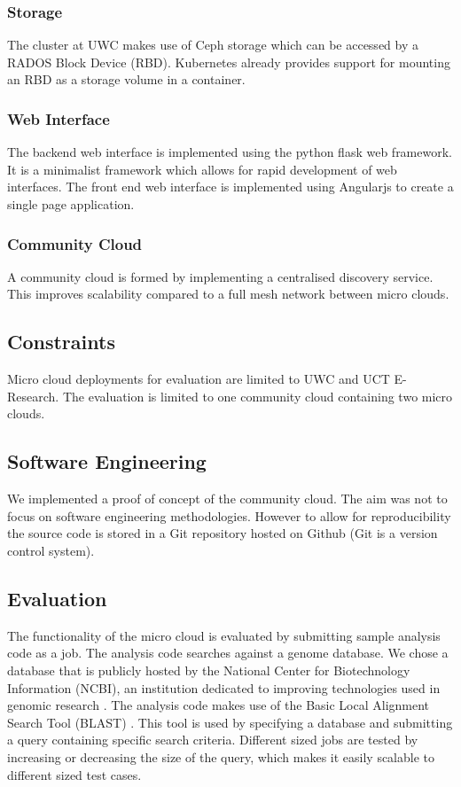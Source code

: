 \documentclass{sig-alternate-05-2015}
\begin{document}
\subsubsection{Storage}
The cluster at UWC makes use of Ceph storage which can be accessed by a RADOS Block Device (RBD). Kubernetes already provides support for mounting an RBD as a storage volume in a container.

\subsubsection{Web Interface}
The backend web interface is implemented using the python flask web framework. It is a minimalist framework which allows for rapid development of web interfaces. 
The front end web interface is implemented using Angularjs to create a single page application. 

\subsubsection{Community Cloud}
A community cloud is formed by implementing a centralised discovery service. This improves scalability compared to a full mesh network between micro clouds.


\subsection{Constraints}
Micro cloud deployments for evaluation are limited to UWC and UCT E-Research. The evaluation is limited to one community cloud containing two micro clouds.

\subsection{Software Engineering}

We implemented a proof of concept of the community cloud. The aim was not to focus on software engineering methodologies. However to allow for reproducibility the source code is stored in a Git repository hosted on Github (Git is a version control system). 




\subsection{Evaluation}
The functionality of the micro cloud is evaluated by submitting sample analysis code as a job. The analysis code searches against a genome database. We chose a database that is publicly hosted by the National Center for Biotechnology Information (NCBI), an institution dedicated to improving technologies used in genomic research \cite{pruitt2005ncbi}. The analysis code makes use of the Basic Local Alignment Search Tool (BLAST) \cite{camacho2009blast}. This tool is used by specifying a database and submitting a query containing specific search criteria. Different sized jobs are tested by increasing or decreasing the size of the query, which makes it easily scalable to different sized test cases.











 
\end{document}
